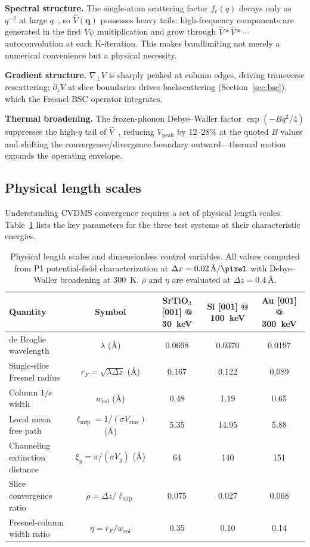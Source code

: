 \documentclass[twoside,11pt]{article}
\begin{document}
\textbf{Spectral structure.} The single-atom scattering factor $f_e(q)$ decays only as $q^{-2}$ at large $q$~\cite{LobatoVanDyck2014}, so $\hat V(\mathbf{q})$ possesses heavy tails: high-frequency components are generated in the first $V\psi$ multiplication and grow through $\hat V*\hat V*\cdots$ autoconvolution at each K-iteration. This makes bandlimiting not merely a numerical convenience but a physical necessity.

\textbf{Gradient structure.} $\nabla_\perp V$ is sharply peaked at column edges, driving transverse rescattering; $\partial_z V$ at slice boundaries drives backscattering (Section~\ref{sec:bsc}), which the Fresnel BSC operator integrates.

\textbf{Thermal broadening.} The frozen-phonon Debye--Waller factor $\exp(-Bq^2/4)$ suppresses the high-$q$ tail of $\hat V$~\cite{Forbes2010}, reducing $V_\text{peak}$ by 12--28\% at the quoted $B$ values and shifting the convergence/divergence boundary outward---thermal motion expands the operating envelope.

\subsection{Physical length scales}\label{sec:length-scales}

Understanding CVDMS convergence requires a set of physical length scales. Table~\ref{tab:length-scales} lists the key parameters for the three test systems at their characteristic energies.

\begin{table}[H]
\centering
\caption{Physical length scales and dimensionless control variables. All values computed from P1 potential-field characterization at $\Delta x=\SI{0.02}{\angstrom\per\pixel}$ with Debye--Waller broadening at \SI{300}{\kelvin}. $\rho$ and $\eta$ are evaluated at $\Delta z=\SI{0.4}{\angstrom}$.}\label{tab:length-scales}
\small
\begin{tabular}{lcccc}
\toprule
Quantity & Symbol & SrTiO$_3$ [001] @ 30~keV & Si [001] @ 100~keV & Au [001] @ 300~keV \\
\midrule
de Broglie wavelength & $\lambda$ (\AA) & 0.0698 & 0.0370 & 0.0197 \\
Single-slice Fresnel radius & $r_F=\sqrt{\lambda\Delta z}$ (\AA) & 0.167 & 0.122 & 0.089 \\
Column $1/e$ width & $w_\text{col}$ (\AA) & 0.48 & 1.19 & 0.65 \\
Local mean free path & $\ell_\text{mfp}=1/(\sigma V_\text{rms})$ (\AA) & 5.35 & 14.95 & 5.88 \\
Channeling extinction distance & $\xi_g=\pi/(\sigma V_g)$ (\AA) & 64 & 140 & 151 \\
Slice convergence ratio & $\rho=\Delta z/\ell_\text{mfp}$ & 0.075 & 0.027 & 0.068 \\
Fresnel-column width ratio & $\eta=r_F/w_\text{col}$ & 0.35 & 0.10 & 0.14 \\
\bottomrule
\end{tabular}
\end{table}
\end{document}
